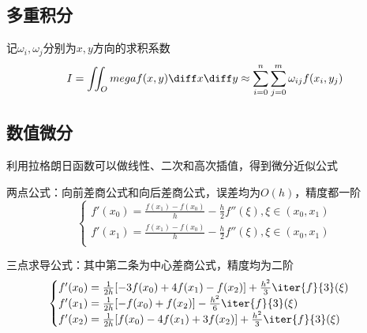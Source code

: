 \subsection{多重积分}
记$\omega_i,\omega_j$分别为$x,y$方向的求积系数
\[I=\iint_Omega f(x,y)\diff x\diff y\approx\sum_{i=0}^n\sum_{j=0}^m\omega_{ij}f(x_i,y_j)\]

\subsection{数值微分}
利用拉格朗日函数可以做线性、二次和高次插值，得到微分近似公式

两点公式：向前差商公式和向后差商公式，误差均为$O(h)$，精度都一阶
\[\begin{cases}
    f'(x_0)=\frac{f(x_1)-f(x_0)}{h}-\frac{h}{2}f''(\xi),\xi\in(x_0,x_1)\\
    f'(x_1)=\frac{f(x_1)-f(x_0)}{h}-\frac{h}{2}f''(\xi),\xi\in(x_0,x_1)\\
\end{cases}\]

三点求导公式：其中第二条为中心差商公式，精度均为二阶
\[\begin{cases}
    f'(x_0)=\frac{1}{2h}[-3f(x_0)+4f(x_1)-f(x_2)]+\frac{h^2}{3}\iter{f}{3}(\xi)\\
    f'(x_1)=\frac{1}{2h}[-f(x_0)+f(x_2)]-\frac{h^2}{6}\iter{f}{3}(\xi)\\
    f'(x_2)=\frac{1}{2h}[f(x_0)-4f(x_1)+3f(x_2)]+\frac{h^2}{3}\iter{f}{3}(\xi)
\end{cases}\]